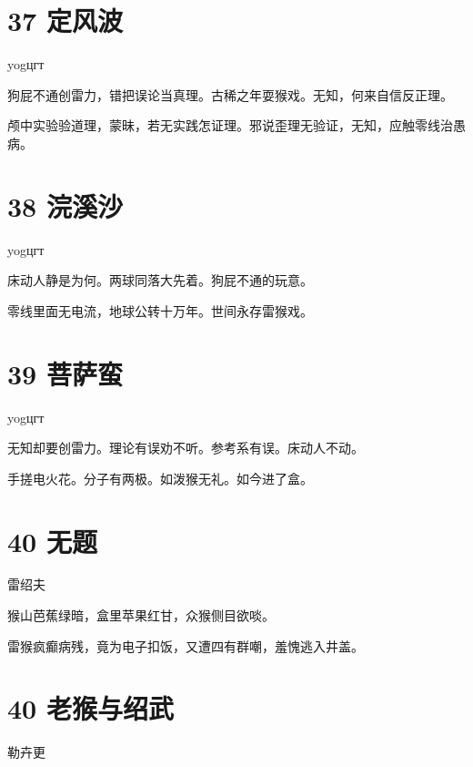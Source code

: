 \documentclass[UTF8,12pt,oneside]{ctexbook}
\begin{document}
        \section{37 定风波}
        \begin{center}
            yogцгт
        \end{center}
        
        狗屁不通创雷力，错把误论当真理。古稀之年耍猴戏。无知，何来自信反正理。
        
        颅中实验验道理，蒙昧，若无实践怎证理。邪说歪理无验证，无知，应触零线治愚病。
        ~\\
        
        \section{38 浣溪沙}
        \begin{center}
            yogцгт
        \end{center}
        
        床动人静是为何。两球同落大先着。狗屁不通的玩意。
        
        零线里面无电流，地球公转十万年。世间永存雷猴戏。
        ~\\
        
        \section{39 菩萨蛮}
        \begin{center}
            yogцгт
        \end{center}
        
        无知却要创雷力。理论有误劝不听。参考系有误。床动人不动。
        
        手搓电火花。分子有两极。如泼猴无礼。如今进了盒。
        
        \newpage
        
        \section{40 无题}
        \begin{center}
            雷绍夫
        \end{center}
        
        猴山芭蕉绿暗，盒里苹果红甘，众猴侧目欲啖。
        
        雷猴疯癫病残，竟为电子扣饭，又遭四有群嘲，羞愧逃入井盖。
        
        \section{40 老猴与绍武}
        \begin{center}
            勒卉更
        \end{center}
        
\end{document}
